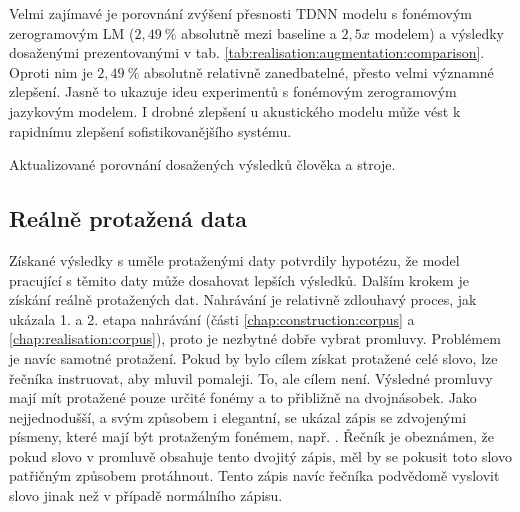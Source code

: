 Velmi zajímavé je porovnání zvýšení přesnosti TDNN modelu s fonémovým zerogramovým LM ($2,49\ \%$ absolutně mezi baseline a $2,5x$ modelem) a výsledky dosaženými prezentovanými v tab. \ref{tab:realisation:augmentation:comparison}. Oproti nim je $2,49\ \%$ absolutně relativně zanedbatelné, přesto velmi významné zlepšení. Jasně to ukazuje ideu experimentů s fonémovým zerogramovým jazykovým modelem. I drobné zlepšení u akustického modelu může vést k rapidnímu zlepšení sofistikovanějšího systému.

\begin{table}[htpb]
  \centering
  \def\arraystretch{1.5}
  \caption{Aktualizované porovnání dosažených výsledků člověka a stroje.}
  \label{tab:realisation:augmentation:comparison}
\end{table}


\subsection{Reálně protažená data}
\label{chap:realisation:augmentation:real}

Získané výsledky s uměle protaženými daty potvrdily hypotézu, že model pracující s těmito daty může dosahovat lepších výsledků. Dalším krokem je získání reálně protažených dat. Nahrávání je relativně zdlouhavý proces, jak ukázala 1. a 2. etapa nahrávání (části \ref{chap:construction:corpus} a \ref{chap:realisation:corpus}), proto je nezbytné dobře vybrat promluvy. Problémem je navíc samotné protažení. Pokud by bylo cílem získat protažené celé slovo, lze řečníka instruovat, aby mluvil pomaleji. To, ale cílem není. Výsledné promluvy mají mít protažené pouze určité fonémy a to přibližně na dvojnásobek. Jako nejjednodušší, a svým způsobem i elegantní, se ukázal zápis se zdvojenými písmeny, které mají být protaženým fonémem, např. . Řečník je obeznámen, že pokud slovo v promluvě obsahuje tento dvojitý zápis, měl by se pokusit toto slovo patřičným způsobem protáhnout. Tento zápis navíc řečníka podvědomě  vyslovit slovo jinak než v případě normálního zápisu.

